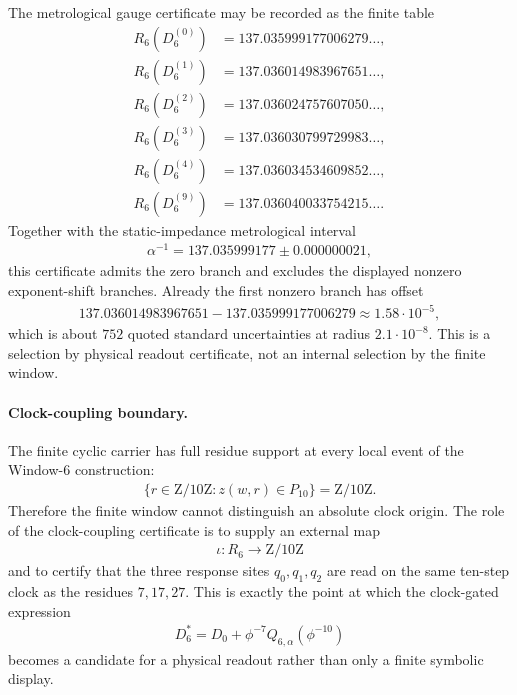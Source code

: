 The metrological gauge certificate may be recorded as the finite table
$$
\begin{aligned}
R_6(D_6^{(0)})&=137.035999177006279\ldots,\\
R_6(D_6^{(1)})&=137.036014983967651\ldots,\\
R_6(D_6^{(2)})&=137.036024757607050\ldots,\\
R_6(D_6^{(3)})&=137.036030799729983\ldots,\\
R_6(D_6^{(4)})&=137.036034534609852\ldots,\\
R_6(D_6^{(9)})&=137.036040033754215\ldots .
\end{aligned}
$$
Together with the static-impedance metrological interval
$$
\begin{aligned}
\alpha^{-1}=137.035999177\pm 0.000000021,
\end{aligned}
$$
this certificate admits the zero branch and excludes the displayed nonzero exponent-shift branches.  Already the first nonzero branch has offset
$$
\begin{aligned}
137.036014983967651-137.035999177006279
\approx 1.58\cdot 10^{-5},
\end{aligned}
$$
which is about $752$ quoted standard uncertainties at radius $2.1\cdot 10^{-8}$.  This is a selection by physical readout certificate, not an internal selection by the finite window.

\paragraph{Clock-coupling boundary.}
The finite cyclic carrier has full residue support at every local event of the Window-6 construction:
$$
\begin{aligned}
\{r\in\mathrm{Z}/10\mathrm{Z}:z(w,r)\in P_{10}\}
=
\mathrm{Z}/10\mathrm{Z}.
\end{aligned}
$$
Therefore the finite window cannot distinguish an absolute clock origin.  The role of the clock-coupling certificate is to supply an external map
$$
\begin{aligned}
\iota:R_6\to \mathrm{Z}/10\mathrm{Z}
\end{aligned}
$$
and to certify that the three response sites $q_0,q_1,q_2$ are read on the same ten-step clock as the residues $7,17,27$.  This is exactly the point at which the clock-gated expression
$$
\begin{aligned}
D_6^{*}=D_0+\phi^{-7}Q_{6,\alpha}(\phi^{-10})
\end{aligned}
$$
becomes a candidate for a physical readout rather than only a finite symbolic display.

